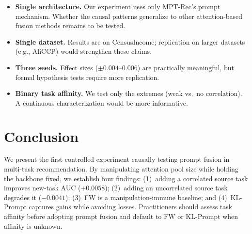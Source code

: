 \documentclass[sigconf,anonymous]{acmart}
\begin{document}
\begin{itemize}
  \item \textbf{Single architecture.} Our experiment uses only MPT-Rec's
    prompt mechanism. Whether the causal patterns generalize to other
    attention-based fusion methods remains to be tested.
  \item \textbf{Single dataset.} Results are on CensusIncome; replication on
    larger datasets (e.g., AliCCP) would strengthen these claims.
  \item \textbf{Three seeds.} Effect sizes ($\pm 0.004$--$0.006$) are
    practically meaningful, but formal hypothesis tests require more
    replication.
  \item \textbf{Binary task affinity.} We test only the extremes (weak vs.\ no
    correlation). A continuous characterization would be more informative.
\end{itemize}

\section{Conclusion}

We present the first controlled experiment causally testing prompt fusion in
multi-task recommendation. By manipulating attention pool size while holding
the backbone fixed, we establish four findings: (1)~adding a correlated source
task improves new-task AUC ($+0.0058$); (2)~adding an uncorrelated source task
degrades it ($-0.0041$); (3)~FW is a manipulation-immune baseline; and
(4)~KL-Prompt captures gains while avoiding losses. Practitioners should
assess task affinity before adopting prompt fusion and default to FW or
KL-Prompt when affinity is unknown.
\end{document}
